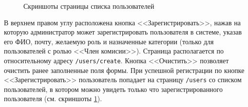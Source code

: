 \documentclass[a4paper,12pt,reqno]{article}
\begin{document}
\begin{figure}[H]
\begin{subfigure}[b]{0.475\linewidth}
		\end{subfigure}
		\caption{Скриншоты страницы списка пользователей}
		\label{pic: users}
	\end{figure}
	
	В верхнем правом углу расположена кнопка <<Зарегистрировать>>, нажав на которую администратор может зарегистрировать пользователя в системе, указав его ФИО, почту, желаемую роль и назначенные категории (только для пользователей с ролью <<Член комисии>>). Страница располагается по относительному адресу \texttt{/users/create}. Кнопка <<Очистить>> позволяет очистить ранее заполненные поля формы. При успешной регистрации по кнопке <<Зарегистрировать>> пользователь попадает на страницу \texttt{/users} со списком пользователей, в котором можно увидеть только что зарегистрированного пользователя (см. скриншоты \ref{pic: users}).
	
\end{document}
